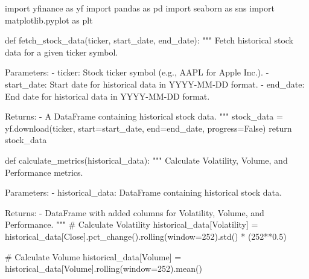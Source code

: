 \documentclass[
  letterpaper,
  DIV=11,
  numbers=noendperiod]{scrreprt}
\newenvironment{Shaded}{\begin{snugshade}}{\end{snugshade}}
\newcommand{\CommentTok}[1]{\textcolor[rgb]{0.37,0.37,0.37}{#1}}
\newcommand{\ControlFlowTok}[1]{\textcolor[rgb]{0.00,0.23,0.31}{#1}}
\newcommand{\DecValTok}[1]{\textcolor[rgb]{0.68,0.00,0.00}{#1}}
\newcommand{\FloatTok}[1]{\textcolor[rgb]{0.68,0.00,0.00}{#1}}
\newcommand{\ImportTok}[1]{\textcolor[rgb]{0.00,0.46,0.62}{#1}}
\newcommand{\KeywordTok}[1]{\textcolor[rgb]{0.00,0.23,0.31}{#1}}
\newcommand{\NormalTok}[1]{\textcolor[rgb]{0.00,0.23,0.31}{#1}}
\newcommand{\OperatorTok}[1]{\textcolor[rgb]{0.37,0.37,0.37}{#1}}
\newcommand{\StringTok}[1]{\textcolor[rgb]{0.13,0.47,0.30}{#1}}
\newcommand{\VariableTok}[1]{\textcolor[rgb]{0.07,0.07,0.07}{#1}}
\begin{document}
\begin{Shaded}
\begin{Highlighting}[]
\ImportTok{import}\NormalTok{ yfinance }\ImportTok{as}\NormalTok{ yf}
\ImportTok{import}\NormalTok{ pandas }\ImportTok{as}\NormalTok{ pd}
\ImportTok{import}\NormalTok{ seaborn }\ImportTok{as}\NormalTok{ sns}
\ImportTok{import}\NormalTok{ matplotlib.pyplot }\ImportTok{as}\NormalTok{ plt}

\KeywordTok{def}\NormalTok{ fetch\_stock\_data(ticker, start\_date, end\_date):}
    \CommentTok{"""}
\CommentTok{    Fetch historical stock data for a given ticker symbol.}

\CommentTok{    Parameters:}
\CommentTok{    {-} ticker: Stock ticker symbol (e.g., AAPL for Apple Inc.).}
\CommentTok{    {-} start\_date: Start date for historical data in \textquotesingle{}YYYY{-}MM{-}DD\textquotesingle{} format.}
\CommentTok{    {-} end\_date: End date for historical data in \textquotesingle{}YYYY{-}MM{-}DD\textquotesingle{} format.}

\CommentTok{    Returns:}
\CommentTok{    {-} A DataFrame containing historical stock data.}
\CommentTok{    """}
\NormalTok{    stock\_data }\OperatorTok{=}\NormalTok{ yf.download(ticker, start}\OperatorTok{=}\NormalTok{start\_date, end}\OperatorTok{=}\NormalTok{end\_date, progress}\OperatorTok{=}\VariableTok{False}\NormalTok{)}
    \ControlFlowTok{return}\NormalTok{ stock\_data}

\KeywordTok{def}\NormalTok{ calculate\_metrics(historical\_data):}
    \CommentTok{"""}
\CommentTok{    Calculate Volatility, Volume, and Performance metrics.}

\CommentTok{    Parameters:}
\CommentTok{    {-} historical\_data: DataFrame containing historical stock data.}

\CommentTok{    Returns:}
\CommentTok{    {-} DataFrame with added columns for Volatility, Volume, and Performance.}
\CommentTok{    """}
    \CommentTok{\# Calculate Volatility}
\NormalTok{    historical\_data[}\StringTok{\textquotesingle{}Volatility\textquotesingle{}}\NormalTok{] }\OperatorTok{=}\NormalTok{ historical\_data[}\StringTok{\textquotesingle{}Close\textquotesingle{}}\NormalTok{].pct\_change().rolling(window}\OperatorTok{=}\DecValTok{252}\NormalTok{).std() }\OperatorTok{*}\NormalTok{ (}\DecValTok{252}\OperatorTok{**}\FloatTok{0.5}\NormalTok{)}
    
    \CommentTok{\# Calculate Volume}
\NormalTok{    historical\_data[}\StringTok{\textquotesingle{}Volume\textquotesingle{}}\NormalTok{] }\OperatorTok{=}\NormalTok{ historical\_data[}\StringTok{\textquotesingle{}Volume\textquotesingle{}}\NormalTok{].rolling(window}\OperatorTok{=}\DecValTok{252}\NormalTok{).mean()}
    

\end{Highlighting}
\end{Shaded}
\end{document}
